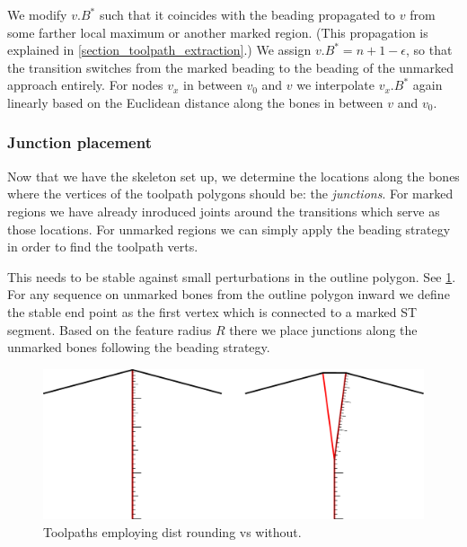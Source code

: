 We modify $v.B^*$ such that it coincides with the beading propagated to $v$ from some farther local maximum or another marked region.
(This propagation is explained in \cref{section_toolpath_extraction}.)
We assign $v.B^* = n + 1 - \epsilon$, so that the transition switches from the marked beading to the beading of the unmarked approach entirely.
For nodes $v_x$ in between $v_0$ and $v$ we interpolate $v_x.B^*$ again linearly based on the Euclidean distance along the bones in between $v$ and $v_0$.







\subsubsection{Junction placement}

Now that we have the skeleton set up, we determine the locations along the bones where the vertices of the toolpath polygons should be: the \emph{junctions}.
For marked regions we have already inroduced joints around the transitions which serve as those locations.
For unmarked regions we can simply apply the beading strategy in order to find the toolpath verts.


This needs to be stable against small perturbations in the outline polygon.
See \cref{heterogeneous_joint_generation}.
For any sequence on unmarked bones from the outline polygon inward we define the stable end point as the first vertex which is connected to a marked ST segment.
Based on the feature radius $R$ there we place junctions along the unmarked bones following the beading strategy.

\begin{figure}
\includegraphics[width=\columnwidth]{sources/method/heterogeneous_joint_generation.pdf}
\caption{Toolpaths employing dist rounding vs without.}
\label{heterogeneous_joint_generation}
\end{figure}





